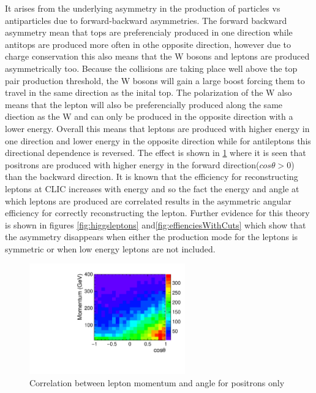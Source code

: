 It arises from the underlying asymmetry in the production of particles vs antiparticles due to forward-backward asymmetries. The forward backward asymmetry mean that tops are preferencialy produced in one direction while antitops are produced more often in othe opposite direction, however due to charge conservation this also means that the W bosons and leptons are produced asymmetrically too. Because the collisions are taking place well above the top pair production threshold, the W bosons will gain a large boost forcing them to travel in the same direction as the inital top. The polarization of the W also means that the lepton will also be preferencially produced along the same diection as the W and can only be produced in the opposite direction with a lower energy. Overall this means that leptons are produced with higher energy in one direction and lower energy in the opposite direction while for antileptons this directional dependence is reversed. The effect is shown in \ref{fig:efficiency2d} where it is seen that positrons are produced with higher energy in the forward direction($cos\theta>0$) than the backward direction. It is known that the efficiency for reconstructing leptons at CLIC increases with energy and so the fact the energy and angle at which leptons are produced are correlated results in the asymmetric angular efficiency for correctly reconstructing the lepton. Further evidence for this theory is shown in figures \ref{fig:higgsleptons} and\ref{fig:effienciesWithCuts} which show that the asymmetry disappears when either the production mode for the leptons is symmetric or when low energy leptons are not included.

\begin{figure}
  \centering
  \includegraphics[width=0.6\textwidth]{TopAnalysis/figures/MomentumVsTheta}
  \caption[Lepton Momentum Vs Angle]{Correlation between lepton momentum and angle for positrons only}
  \label{fig:efficiency2d}
\end{figure}

